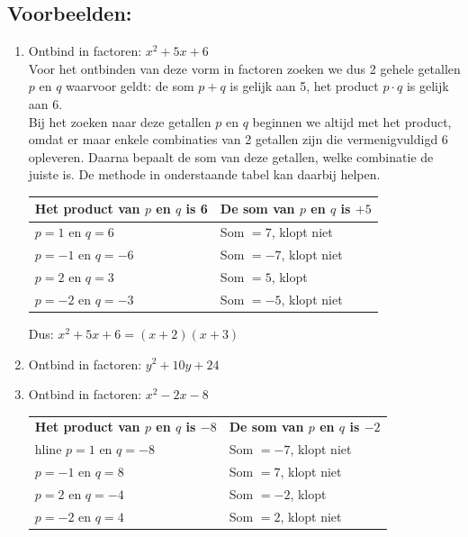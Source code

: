 \subsection*{Voorbeelden:}
\begin{enumerate}
    \itemsep1em
    \item Ontbind in factoren: $x^2+5x+6$ \\

    Voor het ontbinden van deze vorm in factoren zoeken we dus 2 gehele getallen $p$ en $q$ waarvoor geldt: de som $p+q$ is gelijk aan 5, het product $p\cdot q$ is gelijk aan 6. \\
    
    Bij het zoeken naar deze getallen $p$ en $q$ beginnen we altijd met het product, omdat er maar enkele combinaties van 2 getallen zijn die vermenigvuldigd 6 opleveren. Daarna bepaalt de som van deze getallen, welke combinatie de juiste is. De methode in onderstaande tabel kan daarbij helpen.
    
    \begin{table}[H]
        \centering
        \renewcommand{\arraystretch}{1.4}
        \begin{tabular}{|l|l|}
            \hline
            \rowcolor{vakgray}
            \textbf{Het product van $p$ en $q$ is 6} & \textbf{De som van $p$ en $q$ is $+5$} \\ \hline
            $p = 1$ en $q = 6$      & Som $= 7$, klopt niet \\ \hline
            $p = -1$ en $q = -6$    & Som $= -7$, klopt niet \\ \hline
            $p = 2$ en $q = 3$      & Som $= 5$, klopt \\ \hline
            $p = -2$ en $q = -3$    & Som $= -5$, klopt niet \\ \hline
        \end{tabular}
    \end{table}
    Dus: $x^2+5x+6=(x+2)(x+3)$ 

    \item Ontbind in factoren: $y^2+10y+24$ 

	\item Ontbind in factoren: $x^2-2x-8$

    \begin{table}[H]
        \centering
        \renewcommand{\arraystretch}{1.4}
        \begin{tabular}{|l|l|}
            \hline
            \rowcolor{vakgray}
            \textbf{Het product van $p$ en $q$ is $-8$} & \textbf{De som van $p$ en $q$ is $-2$} \\ hline
            $p = 1$ en $q = -8$     & Som $= -7$, klopt niet \\ \hline
            $p = -1$ en $q = 8$     & Som $= 7$, klopt niet \\ \hline
            $p = 2$ en $q = -4$     & Som $= -2$, klopt \\ \hline
            $p = -2$ en $q = 4$     & Som $= 2$, klopt niet \\ \hline
        \end{tabular}
    \end{table}


\end{enumerate}
